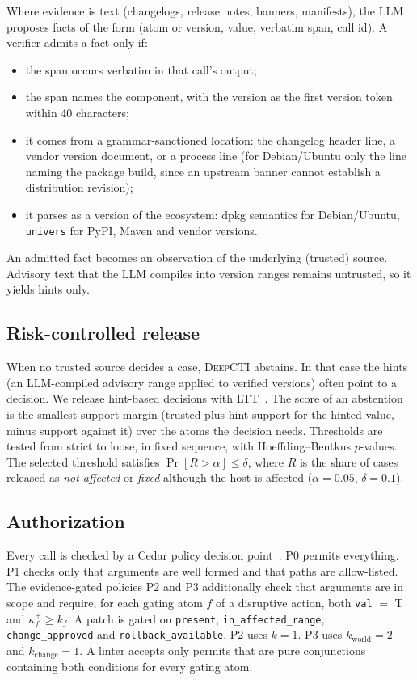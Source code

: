 \documentclass[conference]{IEEEtran}
\newcommand{\DC}{\textsc{DeepCTI}}
\newcommand{\Bel}[1]{\textsf{#1}}
\begin{document}
Where evidence is text (changelogs, release notes, banners, manifests), the LLM proposes facts of the form
(atom or version, value, verbatim span, call id). A verifier admits a fact only if:
\begin{itemize}
\item the span occurs verbatim in that call's output;
\item the span names the component, with the version as the first version token within 40 characters;
\item it comes from a grammar-sanctioned location: the changelog header line, a vendor version document,
  or a process line (for Debian/Ubuntu only the line naming the package build, since an upstream banner
  cannot establish a distribution revision);
\item it parses as a version of the ecosystem: dpkg semantics for Debian/Ubuntu, \texttt{univers} for
  PyPI, Maven and vendor versions.
\end{itemize}
An admitted fact becomes an observation of the underlying (trusted) source. Advisory text that the LLM
compiles into version ranges remains untrusted, so it yields hints only.

\subsection{Risk-controlled release}

When no trusted source decides a case, \DC{} abstains. In that case the hints (an LLM-compiled advisory
range applied to verified versions) often point to a decision. We release hint-based decisions with LTT~\cite{angelopoulos2021ltt}. The score of an abstention is
the smallest support margin (trusted plus hint support for the hinted value, minus support against it)
over the atoms the decision needs. Thresholds are tested from strict to loose, in fixed sequence, with
Hoeffding--Bentkus $p$-values. The selected threshold satisfies $\Pr[R>\alpha]\le\delta$, where $R$ is
the share of cases released as \emph{not affected} or \emph{fixed} although the host is affected
($\alpha=0.05$, $\delta=0.1$).

\subsection{Authorization}

Every call is checked by a Cedar policy decision point~\cite{cutler2024cedar}. P0 permits everything.
P1 checks only that arguments are well formed and that paths are allow-listed. The evidence-gated policies P2 and P3 additionally
check that arguments are in scope and require, for each gating atom $f$ of a disruptive action, both \texttt{val} $=$ \Bel{T} and
$\kappa^+_f\ge k_f$. A patch is gated on \texttt{present}, \texttt{in\_affected\_range},
\texttt{change\_approved} and \texttt{rollback\_available}. P2 uses $k=1$. P3 uses $k_{\text{world}}=2$
and $k_{\text{change}}=1$. A linter accepts only permits that are pure conjunctions containing both
conditions for every gating atom.
\end{document}
